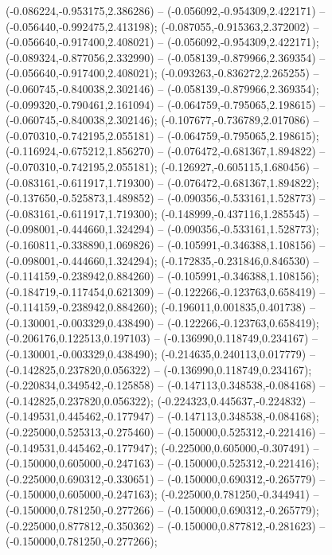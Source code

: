  (-0.086224,-0.953175,2.386286) -- (-0.056092,-0.954309,2.422171) -- (-0.056440,-0.992475,2.413198);
 (-0.087055,-0.915363,2.372002) -- (-0.056640,-0.917400,2.408021) -- (-0.056092,-0.954309,2.422171);
 (-0.089324,-0.877056,2.332990) -- (-0.058139,-0.879966,2.369354) -- (-0.056640,-0.917400,2.408021);
 (-0.093263,-0.836272,2.265255) -- (-0.060745,-0.840038,2.302146) -- (-0.058139,-0.879966,2.369354);
 (-0.099320,-0.790461,2.161094) -- (-0.064759,-0.795065,2.198615) -- (-0.060745,-0.840038,2.302146);
 (-0.107677,-0.736789,2.017086) -- (-0.070310,-0.742195,2.055181) -- (-0.064759,-0.795065,2.198615);
 (-0.116924,-0.675212,1.856270) -- (-0.076472,-0.681367,1.894822) -- (-0.070310,-0.742195,2.055181);
 (-0.126927,-0.605115,1.680456) -- (-0.083161,-0.611917,1.719300) -- (-0.076472,-0.681367,1.894822);
 (-0.137650,-0.525873,1.489852) -- (-0.090356,-0.533161,1.528773) -- (-0.083161,-0.611917,1.719300);
 (-0.148999,-0.437116,1.285545) -- (-0.098001,-0.444660,1.324294) -- (-0.090356,-0.533161,1.528773);
 (-0.160811,-0.338890,1.069826) -- (-0.105991,-0.346388,1.108156) -- (-0.098001,-0.444660,1.324294);
 (-0.172835,-0.231846,0.846530) -- (-0.114159,-0.238942,0.884260) -- (-0.105991,-0.346388,1.108156);
 (-0.184719,-0.117454,0.621309) -- (-0.122266,-0.123763,0.658419) -- (-0.114159,-0.238942,0.884260);
 (-0.196011,0.001835,0.401738) -- (-0.130001,-0.003329,0.438490) -- (-0.122266,-0.123763,0.658419);
 (-0.206176,0.122513,0.197103) -- (-0.136990,0.118749,0.234167) -- (-0.130001,-0.003329,0.438490);
 (-0.214635,0.240113,0.017779) -- (-0.142825,0.237820,0.056322) -- (-0.136990,0.118749,0.234167);
 (-0.220834,0.349542,-0.125858) -- (-0.147113,0.348538,-0.084168) -- (-0.142825,0.237820,0.056322);
 (-0.224323,0.445637,-0.224832) -- (-0.149531,0.445462,-0.177947) -- (-0.147113,0.348538,-0.084168);
 (-0.225000,0.525313,-0.275460) -- (-0.150000,0.525312,-0.221416) -- (-0.149531,0.445462,-0.177947);
 (-0.225000,0.605000,-0.307491) -- (-0.150000,0.605000,-0.247163) -- (-0.150000,0.525312,-0.221416);
 (-0.225000,0.690312,-0.330651) -- (-0.150000,0.690312,-0.265779) -- (-0.150000,0.605000,-0.247163);
 (-0.225000,0.781250,-0.344941) -- (-0.150000,0.781250,-0.277266) -- (-0.150000,0.690312,-0.265779);
 (-0.225000,0.877812,-0.350362) -- (-0.150000,0.877812,-0.281623) -- (-0.150000,0.781250,-0.277266);
